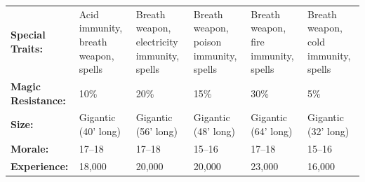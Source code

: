 \begin{minipage}{\columnwidth}
\begin{tabular}{p{}g{.13\columnwidth}p{.13\columnwidth}g{.13\columnwidth}p{.13\columnwidth}g{.13\columnwidth}}
\textbf{Special Traits:} 	& Acid immunity, breath weapon, spells	& Breath weapon, electricity immunity, spells	& Breath weapon, poison immunity, spells	& Breath weapon, fire immunity, spells	& Breath weapon, cold immunity, spells	\\
\textbf{Magic Resistance:} 	& 10\%			& 20\%		 	& 15\%			& 30\%			& 5\%	\\
\textbf{Size:} 			& Gigantic (40' long)	& Gigantic (56' long)	& Gigantic (48' long)	& Gigantic (64' long)	& Gigantic (32' long)	\\ %
\textbf{Morale:} 		& 17--18		& 17--18		& 15--16		& 17--18		& 15--16	\\
\textbf{Experience:} 		& 18,000		& 20,000		& 20,000		& 23,000		& 16,000	\\
\end{tabular}

\end{minipage}

